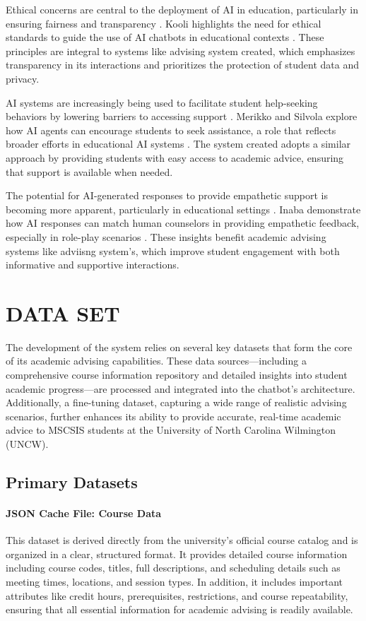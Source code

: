 \documentclass[12pt,oneside,openany]{report}
\begin{document}
Ethical concerns are central to the deployment of AI in education, particularly in ensuring fairness and transparency \cite{su15075614}. Kooli  highlights the need for ethical standards to guide the use of AI chatbots in educational contexts \cite{su15075614}. These principles are integral to systems like advising system created, which emphasizes transparency in its interactions and prioritizes the protection of student data and privacy.

AI systems are increasingly being used to facilitate student help-seeking behaviors by lowering barriers to accessing support \cite{Merikko2024AnAA}. Merikko and Silvola explore how AI agents can encourage students to seek assistance, a role that reflects broader efforts in educational AI systems \cite{Merikko2024AnAA}. The system created adopts a similar approach by providing students with easy access to academic advice, ensuring that support is available when needed.

The potential for AI-generated responses to provide empathetic support is becoming more apparent, particularly in educational settings \cite{inaba2024largelanguagemodelsused}. Inaba  demonstrate how AI responses can match human counselors in providing empathetic feedback, especially in role-play scenarios \cite{inaba2024largelanguagemodelsused}. These insights benefit academic advising systems like adviisng system's, which improve student engagement with both informative and supportive interactions.

\chapter{DATA SET}

The development of the system  relies on several key datasets that form the core of its academic advising capabilities. These data sources—including a comprehensive course information repository and detailed insights into student academic progress—are processed and integrated into the chatbot’s architecture. Additionally, a  fine-tuning dataset, capturing a wide range of realistic advising scenarios, further enhances its ability to provide accurate, real-time academic advice to MSCSIS students at the University of North Carolina Wilmington (UNCW).

\section{Primary Datasets}

\subsubsection{JSON Cache File: Course Data}
This dataset is derived directly from the university’s official course catalog and is organized in a clear, structured format. It provides detailed course information including course codes, titles, full descriptions, and scheduling details such as meeting times, locations, and session types. In addition, it includes important attributes like credit hours, prerequisites, restrictions, and course repeatability, ensuring that all essential information for academic advising is readily available.
\end{document}

